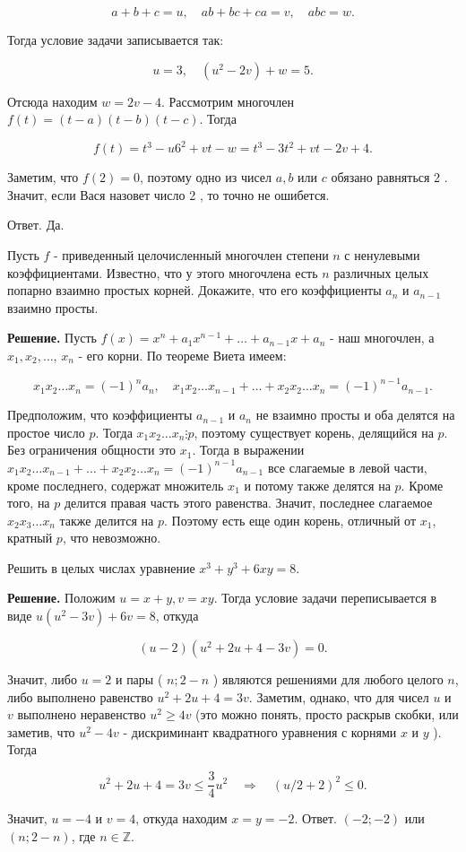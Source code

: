 $$
a+b+c=u, \quad a b+b c+c a=v, \quad a b c=w .
$$

Тогда условие задачи записывается так:

$$
u=3, \quad\left(u^2-2 v\right)+w=5 .
$$


Отсюда находим $w=2 v-4$. Рассмотрим многочлен $f(t)=(t-a)(t-b)(t-c)$. Тогда

$$
f(t)=t^3-u 6^2+v t-w=t^3-3 t^2+v t-2 v+4 .
$$


Заметим, что $f(2)=0$, поэтому одно из чисел $a, b$ или $c$ обязано равняться 2 . Значит, если Вася назовет число 2 , то точно не ошибется.

Ответ. Да.

Пусть $f$ - приведенный целочисленный многочлен степени $n$ с ненулевыми коэффициентами. Известно, что у этого многочлена есть $n$ различных целых попарно взаимно простых корней. Докажите, что его коэффициенты $a_n$ и $a_{n-1}$ взаимно просты.

\textbf{Решение.} Пусть $f(x)=x^n+a_1 x^{n-1}+\ldots+a_{n-1} x+a_n$ - наш многочлен, а $x_1, x_2, \ldots$, $x_n$ - его корни. По теореме Виета имеем:

$$
x_1 x_2 \ldots x_n=(-1)^n a_n, \quad x_1 x_2 \ldots x_{n-1}+\ldots+x_2 x_2 \ldots x_n=(-1)^{n-1} a_{n-1} .
$$

Предположим, что коэффициенты $a_{n-1}$ и $a_n$ не взаимно просты и оба делятся на простое число $p$. Тогда $x_1 x_2 \ldots x_n \vdots p$, поэтому существует корень, делящийся на $p$. Без ограничения общности это $x_1$. Тогда в выражении $x_1 x_2 \ldots x_{n-1}+\ldots+x_2 x_2 \ldots x_n= (-1)^{n-1} a_{n-1}$ все слагаемые в левой части, кроме последнего, содержат множитель $x_1$ и потому также делятся на $p$. Кроме того, на $p$ делится правая часть этого равенства. Значит, последнее слагаемое $x_2 x_3 \ldots x_n$ также делится на $p$. Поэтому есть еще один корень, отличный от $x_1$, кратный $p$, что невозможно.

Решить в целых числах уравнение $x^3+y^3+6 x y=8$.

\textbf{Решение.} Положим $u=x+y, v=x y$. Тогда условие задачи переписывается в виде $u\left(u^2-3 v\right)+6 v=8$, откуда

$$
(u-2)\left(u^2+2 u+4-3 v\right)=0 .
$$


Значит, либо $u=2$ и пары ( $n ; 2-n$ ) являются решениями для любого целого $n$, либо выполнено равенство $u^2+2 u+4=3 v$. Заметим, однако, что для чисел $u$ и $v$ выполнено неравенство $u^2 \geqslant 4 v$ (это можно понять, просто раскрыв скобки, или заметив, что $u^2-4 v$ - дискриминант квадратного уравнения с корнями $x$ и $y$ ). Тогда

$$
u^2+2 u+4=3 v \leqslant \frac{3}{4} u^2 \quad \Longrightarrow \quad(u / 2+2)^2 \leqslant 0 .
$$


Значит, $u=-4$ и $v=4$, откуда находим $x=y=-2$.
Ответ. $(-2 ;-2)$ или $(n ; 2-n)$, где $n \in \mathbb{Z}$.